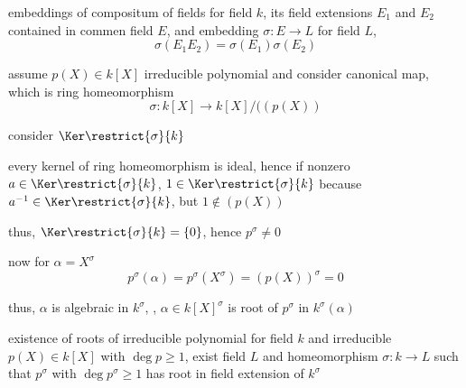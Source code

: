 \documentclass[17pt,landscape]{foils}
\begin{document}
{\vfill
\begin{mylemma}{embeddings of compositum of fields}%
	for
	field $k$,
	its field extensions $E_1$ and $E_2$ contained in commen field $E$,
	and
	embedding $\sigma:E\to L$ for field $L$,
	$$
		\sigma(E_1 E_2) = \sigma(E_1) \sigma(E_2)
	$$
\end{mylemma}
\vfill


%

\bit
\item
	assume $p(X) \in k[X]$ irreducible polynomial and consider canonical map, which is ring homeomorphism
	$$
		\sigma: k[X] \to k[X] / ((p(X))
	$$

\vitem
	consider $\Ker \restrict{\sigma}{k}$
	\bit
	\item
		every kernel of ring homeomorphism is ideal,
		hence if nonzero $a \in \Ker \restrict{\sigma}{k}$, $1\in \Ker \restrict{\sigma}{k}$
		because $a^{-1} \in \Ker \restrict{\sigma}{k}$,
		but $1\not\in (p(X))$
	\item
		thus, $\Ker \restrict{\sigma}{k} = \{0\}$,
		hence $p^\sigma\neq0$
	\eit

\vitem
	now for $\alpha = X^\sigma$
	$$
		p^\sigma(\alpha)
		= p^\sigma(X^\sigma) = (p(X))^\sigma = 0
	$$

\vitem
	thus, $\alpha$ is algebraic in $k^\sigma$,
	\ie,
	$\alpha \in k[X]^\sigma$ is root of $p^\sigma$ in $k^\sigma(\alpha)$
\eit

\begin{mylemma}{existence of roots of irreducible polynomial}%
	for field $k$ and irreducible $p(X)\in k[X]$ with $\deg p \geq 1$,
	exist field $L$ and homeomorphism $\sigma:k \to L$
	such that $p^\sigma$ with $\deg p^\sigma \geq 1$ has root
	in field extension of $k^\sigma$
\end{mylemma}
\vfill
%
%
%


%

}
\end{document}

